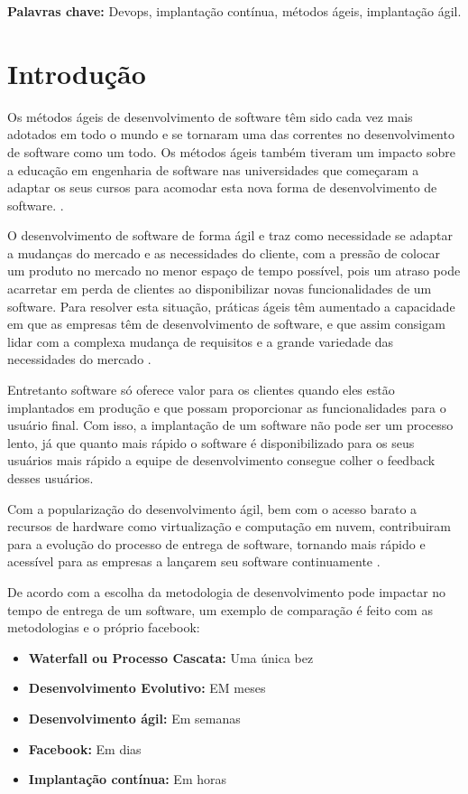 \documentclass[12pt]{article}
\begin{document}
\textbf{Palavras chave:} Devops, implantação contínua, métodos ágeis, implantação ágil.
\section{Introdução}\label{sec1}

Os métodos ágeis de desenvolvimento de software têm sido
cada vez mais adotados em todo o mundo e se tornaram uma das correntes no desenvolvimento de software como um todo. Os métodos ágeis também tiveram um impacto sobre a educação em engenharia de software nas universidades que começaram a adaptar os seus cursos para acomodar esta nova forma de desenvolvimento de software. \cite{brazil}.

O desenvolvimento de software de forma ágil e traz como necessidade se adaptar a mudanças do mercado e as necessidades do cliente, com a pressão de colocar um produto no mercado no menor espaço de tempo possível, pois um atraso pode acarretar em perda de clientes ao disponibilizar novas funcionalidades de um software. Para resolver esta situação, práticas ágeis têm aumentado a capacidade em que as empresas têm de desenvolvimento de software, e que assim consigam lidar com a complexa mudança de requisitos e a grande variedade das necessidades do mercado \cite{dzamashvili2010impact}.

Entretanto software só oferece valor para os clientes quando eles estão implantados em produção e que possam proporcionar as funcionalidades para o usuário final. \cite{6612879} Com isso, a implantação de um software não pode ser um processo lento, já que quanto mais rápido o software é disponibilizado para os seus usuários mais rápido a equipe de desenvolvimento consegue colher o feedback desses usuários. 

Com a popularização do desenvolvimento ágil, bem com o acesso barato a recursos de hardware como virtualização e computação em nuvem, contribuiram para a evolução do processo de entrega de software, tornando mais rápido e acessível para as empresas a lançarem seu software continuamente \cite{6612879}.

De acordo com \cite{6449236} a escolha da metodologia de desenvolvimento pode impactar no tempo de entrega de um software, um exemplo de comparação é feito com as metodologias e o próprio facebook:

\begin{itemize}
	\item \textbf{Waterfall ou Processo Cascata:} Uma única bez
   	\item \textbf{Desenvolvimento Evolutivo:} EM meses
    \item \textbf{Desenvolvimento ágil:} Em semanas
    \item \textbf{Facebook:} Em dias
    \item \textbf{Implantação contínua:} Em horas
\end{itemize}
\end{document}
